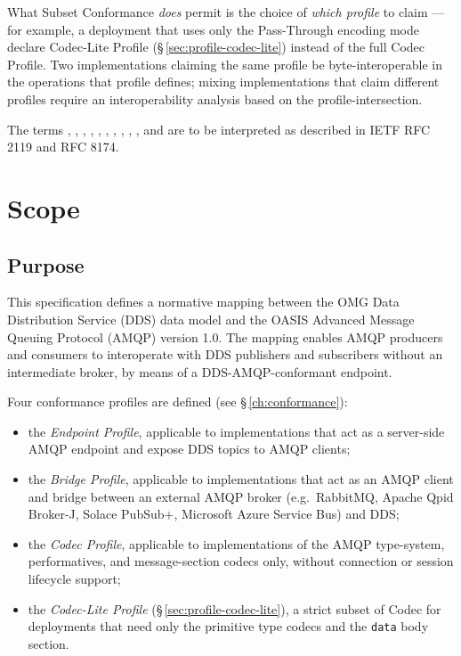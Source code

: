 \documentclass{../styles/zerodds-vendor-spec}
\begin{document}
What Subset Conformance \emph{does} permit is the choice of
\emph{which profile} to claim — for example, a deployment that
uses only the Pass-Through encoding mode  declare
Codec-Lite Profile (\S\,\ref{sec:profile-codec-lite}) instead of
the full Codec Profile. Two implementations claiming the same
profile  be byte-interoperable in the operations
that profile defines; mixing implementations that claim
different profiles  require an interoperability
analysis based on the profile-intersection.

The terms , , ,
, , , ,
, , , and
 are to be interpreted as described in IETF RFC 2119
and RFC 8174.

\chapter{Scope}

\section{Purpose}

This specification defines a normative mapping between the OMG Data
Distribution Service (DDS) data model and the OASIS Advanced Message
Queuing Protocol (AMQP) version 1.0. The mapping enables AMQP
producers and consumers to interoperate with DDS publishers and
subscribers without an intermediate broker, by means of a
DDS-AMQP-conformant endpoint.

Four conformance profiles are defined (see \S\,\ref{ch:conformance}):

\begin{itemize}
  \item the \emph{Endpoint Profile}, applicable to implementations
        that act as a server-side AMQP endpoint and expose DDS topics
        to AMQP clients;
  \item the \emph{Bridge Profile}, applicable to implementations that
        act as an AMQP client and bridge between an external AMQP
        broker (e.g.\ RabbitMQ, Apache Qpid Broker-J, Solace
        PubSub+, Microsoft Azure Service Bus) and DDS;
  \item the \emph{Codec Profile}, applicable to implementations of
        the AMQP type-system, performatives, and message-section
        codecs only, without connection or session lifecycle support;
  \item the \emph{Codec-Lite Profile} (\S\,\ref{sec:profile-codec-lite}),
        a strict subset of Codec for deployments that need only the
        primitive type codecs and the \texttt{data} body section.
\end{itemize}
\end{document}
